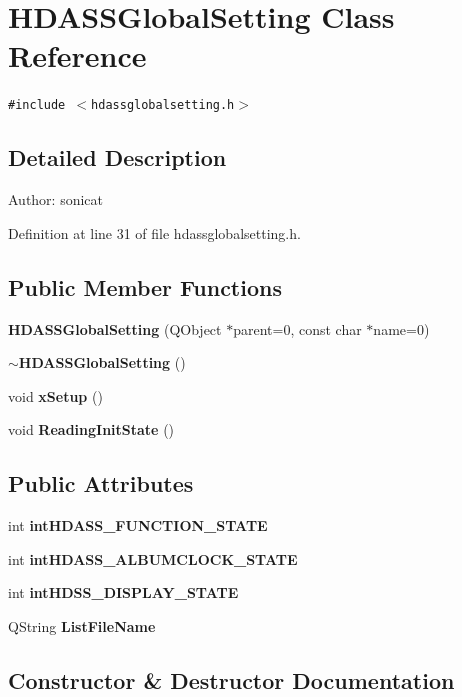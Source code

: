 \section{HDASSGlobal\-Setting Class Reference}
\label{classHDASSGlobalSetting}
{\tt \#include $<$hdassglobalsetting.h$>$}



\subsection{Detailed Description}
\begin{Desc}
\item[Author:]sonicat \end{Desc}




Definition at line 31 of file hdassglobalsetting.h.\subsection*{Public Member Functions}
\begin{CompactItemize}
\item 
{\bf HDASSGlobal\-Setting} (QObject $\ast$parent=0, const char $\ast$name=0)
\item 
{\bf $\sim$HDASSGlobal\-Setting} ()
\item 
void {\bf x\-Setup} ()
\item 
void {\bf Reading\-Init\-State} ()
\end{CompactItemize}
\subsection*{Public Attributes}
\begin{CompactItemize}
\item 
int {\bf int\-HDASS\_\-FUNCTION\_\-STATE}
\item 
int {\bf int\-HDASS\_\-ALBUMCLOCK\_\-STATE}
\item 
int {\bf int\-HDSS\_\-DISPLAY\_\-STATE}
\item 
QString {\bf List\-File\-Name}
\end{CompactItemize}


\subsection{Constructor \& Destructor Documentation}

